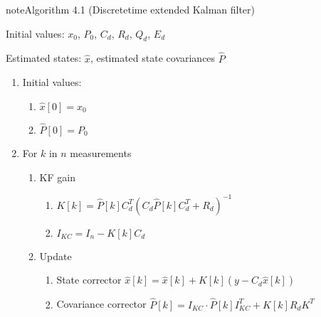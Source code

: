 \documentclass[review]{elsarticle}
\begin{document}
\begin{sphinxadmonition}{note}{Algorithm 4.1 (Discrete\sphinxhyphen{}time extended Kalman filter)}



\sphinxAtStartPar
{} Initial values: \(x_0\), \(P_0\), \(C_d\), \(R_d\), \(Q_d\), \(E_d\)

\sphinxAtStartPar
{} Estimated states: \(\hat{x}\), estimated state covariances \(\hat{P}\)
\begin{enumerate}
%
\item {} 
\sphinxAtStartPar
Initial values:
\begin{enumerate}
%
\item {} 
\sphinxAtStartPar
\(\hat{x}[0] = x_0\)

\item {} 
\sphinxAtStartPar
\(\hat{P}[0] = P_0\)

\end{enumerate}

\item {} 
\sphinxAtStartPar
For \(k\) in \(n\) measurements
\begin{enumerate}
%
\item {} 
\sphinxAtStartPar
KF gain
\begin{enumerate}
%
\item {} 
\sphinxAtStartPar
\(K[k]=\hat{P}[k] C_d^T \left(C_d \hat{P}[k] C_d^T + R_d\right)^{-1}\)

\item {} 
\sphinxAtStartPar
\(I_{KC} = I_n - K[k] C_d\)

\end{enumerate}

\item {} 
\sphinxAtStartPar
Update
\begin{enumerate}
%
\item {} 
\sphinxAtStartPar
State corrector
\(\hat{x}[k] = \hat{x}[k] + K[k] (y - C_d \hat{x}[k]) \)

\item {} 
\sphinxAtStartPar
Covariance corrector
\(\hat{P}[k] = I_{KC} \cdot \hat{P}[k] I_{KC}^T + K[k] R_d K^T \)

\end{enumerate}


\end{enumerate}
\end{enumerate}
\end{sphinxadmonition}
\end{document}

